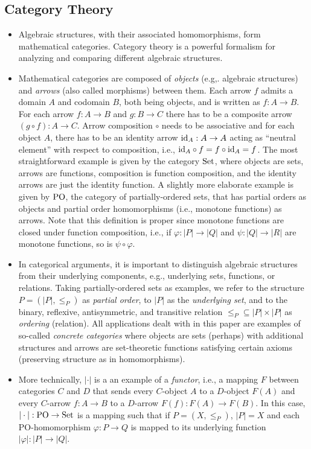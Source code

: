 \subsection{Category Theory}
\begin{itemize}

\item Algebraic structures, with their associated homomorphisms, form mathematical categories. 
Category theory is a powerful formalism for analyzing and comparing different algebraic structures.

\item Mathematical categories are composed of \emph{objects} (e.g,. algebraic structures) and
\emph{arrows} (also called morphisms) between them. Each arrow $f$ admits a domain $A$
and codomain $B$, both being objects, and is written as $f : A \to B$. For each arrow
$f : A \to B$ and $g : B \to C$ there has to be a composite arrow $(g \circ f) : A \to C$.
Arrow composition $\circ$ needs to be associative and for each object $A$, there has to be an identity arrow 
$\idfun{A} : A \to A$ acting as ``neutral element'' with respect to composition, i.e., $\idfun{B} \circ f = f \circ \idfun{A} = f$.
The most straightforward example is given by the category $\setcat$, where objects are sets, arrows are functions, 
composition is function composition, and the identity arrows are just the identity function.
A slightly more elaborate example is given by $\POcat$, the category of partially-ordered sets, that 
has partial orders as objects and partial order homomorphisms (i.e., monotone functions) as arrows.
Note that this definition is proper since monotone functions are closed under function composition, i.e., if $\varphi : |P| \to |Q|$ and 
$\psi : |Q| \to |R|$ are monotone functions, so is $\psi \circ \varphi$.

\item In categorical arguments, it is important to distinguish algebraic structures from their
underlying components, e.g., underlying sets, functions, or relations. Taking
partially-ordered sets as examples, we refer to the structure $P = (|P|, \leq_P)$ as 
\emph{partial order}, to $|P|$ as the \emph{underlying set}, and to the binary, reflexive, antisymmetric, 
and transitive relation $\leq_P {} \subseteq |P| \times |P|$
as \emph{ordering} (relation). All applications dealt with in this paper are examples
of so-called \emph{concrete categories} where objects are sets (perhaps) with additional structures
and arrows are set-theoretic functions satisfying certain axioms (preserving structure as in homomorphisms).

\item More technically, $| \cdot |$ is a an example of a \emph{functor}, i.e., a mapping $F$ between categories
$C$ and $D$ that sends every $C$-object $A$ to a $D$-object $F(A)$ and every $C$-arrow $f : A \to B$ to 
a $D$-arrow $F(f) : F(A) \to F(B)$. In this case, $| \cdot | : \POcat \to \setcat$ is a mapping such that if
$P = (X, \leq_P)$, $|P| = X$ and each PO-homomorphism $\varphi : P \to Q$ is mapped to its underlying function $|\varphi| : |P| \to |Q|$.

\end{itemize}